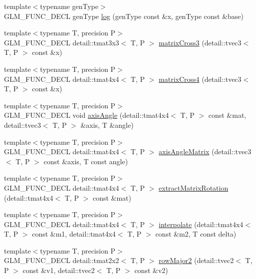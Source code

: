 \begin{CompactItemize}
\item 
{\footnotesize template$<$typename genType$>$ }\\GLM\_\-FUNC\_\-DECL genType \hyperlink{group__gtx__log__base_g62d0cda357eb4e0a3dc7d23241bbb66b}{log} (genType const \&x, genType const \&base)
\item 
{\footnotesize template$<$typename T, precision P$>$ }\\GLM\_\-FUNC\_\-DECL detail::tmat3x3$<$ T, P $>$ \hyperlink{group__gtx__matrix__cross__product_g028629befca6d86f24f58e314827895c}{matrixCross3} (detail::tvec3$<$ T, P $>$ const \&x)
\item 
{\footnotesize template$<$typename T, precision P$>$ }\\GLM\_\-FUNC\_\-DECL detail::tmat4x4$<$ T, P $>$ \hyperlink{group__gtx__matrix__cross__product_g9fae5322a4e4afe9742157f22b505635}{matrixCross4} (detail::tvec3$<$ T, P $>$ const \&x)
\item 
{\footnotesize template$<$typename T, precision P$>$ }\\GLM\_\-FUNC\_\-DECL void \hyperlink{group__gtx__matrix__interpolation_g16474d44af6a32a07c50df2409526d95}{axisAngle} (detail::tmat4x4$<$ T, P $>$ const \&mat, detail::tvec3$<$ T, P $>$ \&axis, T \&angle)
\item 
{\footnotesize template$<$typename T, precision P$>$ }\\GLM\_\-FUNC\_\-DECL detail::tmat4x4$<$ T, P $>$ \hyperlink{group__gtx__matrix__interpolation_gf7c0106d03d55a7b670a6261b107f22b}{axisAngleMatrix} (detail::tvec3$<$ T, P $>$ const \&axis, T const angle)
\item 
{\footnotesize template$<$typename T, precision P$>$ }\\GLM\_\-FUNC\_\-DECL detail::tmat4x4$<$ T, P $>$ \hyperlink{group__gtx__matrix__interpolation_gf559937fe5cea133f5e7f3c228255960}{extractMatrixRotation} (detail::tmat4x4$<$ T, P $>$ const \&mat)
\item 
{\footnotesize template$<$typename T, precision P$>$ }\\GLM\_\-FUNC\_\-DECL detail::tmat4x4$<$ T, P $>$ \hyperlink{group__gtx__matrix__interpolation_gc618bbef632f87be5c570aa5afe63f30}{interpolate} (detail::tmat4x4$<$ T, P $>$ const \&m1, detail::tmat4x4$<$ T, P $>$ const \&m2, T const delta)
\item 
{\footnotesize template$<$typename T, precision P$>$ }\\GLM\_\-FUNC\_\-DECL detail::tmat2x2$<$ T, P $>$ \hyperlink{group__gtx__matrix__major__storage_g9d48983329e8a94489982067dfe8f5cf}{rowMajor2} (detail::tvec2$<$ T, P $>$ const \&v1, detail::tvec2$<$ T, P $>$ const \&v2)

\end{CompactItemize}
